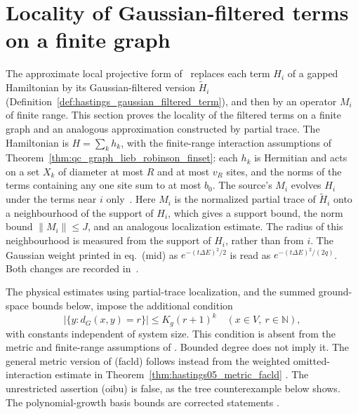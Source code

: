 \section{Locality of Gaussian-filtered terms on a finite graph}
\label{sec:hastings_local_projective_form}


The approximate local projective form of~\cite{Hastings2006Solving} replaces
each term $H_i$ of a gapped Hamiltonian by its Gaussian-filtered version
$\widetilde H_i$ (Definition~\ref{def:hastings_gaussian_filtered_term}), and
then by an operator $M_i$ of finite range. This section proves the locality
of the filtered terms on a finite graph and an analogous approximation
constructed by partial trace. The Hamiltonian is $H=\sum_kh_k$, with the finite-range
interaction assumptions of Theorem~\ref{thm:qc_graph_lieb_robinson_finset}:
each $h_k$ is Hermitian and acts on a set $X_k$ of diameter at most $R$ and
at most $v_R$ sites, and the norms of the terms containing any one site sum
to at most $b_0$. The source's $M_i$ evolves $H_i$ under the terms near $i$
only~\cite[lines 285--307]{Hastings2006Solving}. Here $M_i$ is the normalized
partial trace of $\widetilde H_i$ onto a neighbourhood of the support of
$H_i$, which gives a support bound, the norm bound
$\|M_i\|\le J$, and an analogous localization estimate. The radius of this
neighbourhood is measured from the support of $H_i$, rather than from $i$. The Gaussian weight printed in
eq.~(mid) as $e^{-(t\Delta E)^2/2}$ is read as $e^{-(t\Delta E)^2/(2q)}$. Both
changes are recorded in~\cite{gap:hastings05_filtered_term_approximation}.

The physical estimates using partial-trace localization, and the summed
ground-space bounds below, impose the additional condition
\begin{equation}
    |\{y:d_G(x,y)=r\}|\le K_g(r+1)^k
    \quad(x\in V,\ r\in\mathbb N),
    \label{eq:hastings05_polynomial_sphere_scope}
\end{equation}
with constants independent of system size. This condition is absent from
the metric and finite-range assumptions of
\cite[lines 169--190]{Hastings2006Solving}. Bounded degree does not imply
it. The general metric version of (facld) follows instead from the weighted
omitted-interaction estimate in Theorem~\ref{thm:hastings05_metric_facld}
\cite{gap:hastings05_geometric_growth_scope}. The unrestricted assertion
(oibu) is false, as the tree counterexample below shows. The
polynomial-growth basis bounds are corrected statements
\cite{gap:hastings05_tree_basis_counterexample}.


